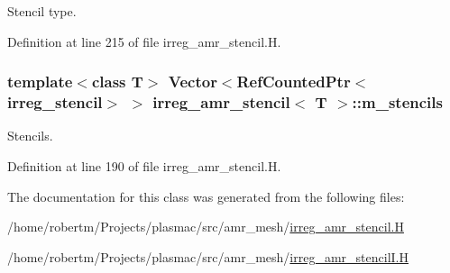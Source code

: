 Stencil type. 



Definition at line 215 of file irreg\+\_\+amr\+\_\+stencil.\+H.

\subsubsection[{\texorpdfstring{m\+\_\+stencils}{m_stencils}}]{\setlength{\rightskip}{0pt plus 5cm}template$<$class T$>$ Vector$<$Ref\+Counted\+Ptr$<${\bf irreg\+\_\+stencil}$>$ $>$ {\bf irreg\+\_\+amr\+\_\+stencil}$<$ T $>$\+::m\+\_\+stencils\hspace{0.3cm}{\ttfamily [protected]}}\hypertarget{classirreg__amr__stencil_a67802854fbf394c876d2727b11c78e35}{}\label{classirreg__amr__stencil_a67802854fbf394c876d2727b11c78e35}


Stencils. 



Definition at line 190 of file irreg\+\_\+amr\+\_\+stencil.\+H.



The documentation for this class was generated from the following files\+:\begin{DoxyCompactItemize}
\item 
/home/robertm/\+Projects/plasmac/src/amr\+\_\+mesh/\hyperlink{irreg__amr__stencil_8H}{irreg\+\_\+amr\+\_\+stencil.\+H}\item 
/home/robertm/\+Projects/plasmac/src/amr\+\_\+mesh/\hyperlink{irreg__amr__stencilI_8H}{irreg\+\_\+amr\+\_\+stencil\+I.\+H}\end{DoxyCompactItemize}
